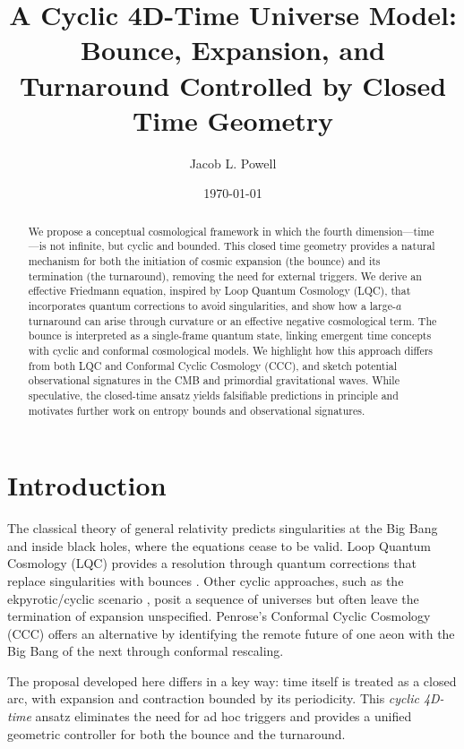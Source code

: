 \documentclass[12pt]{article}
\title{A Cyclic 4D-Time Universe Model: Bounce, Expansion, and Turnaround Controlled by Closed Time Geometry}
\author{Jacob L. Powell}
\date{\today}
\begin{document}
\maketitle

\begin{abstract}
We propose a conceptual cosmological framework in which the fourth dimension---time---is
not infinite, but cyclic and bounded. This closed time geometry provides a natural mechanism
for both the initiation of cosmic expansion (the bounce) and its termination (the turnaround),
removing the need for external triggers. We derive an effective Friedmann equation, inspired by
Loop Quantum Cosmology (LQC), that incorporates quantum corrections to avoid singularities,
and show how a large-$a$ turnaround can arise through curvature or an effective negative
cosmological term. The bounce is interpreted as a single-frame quantum state, linking emergent
time concepts with cyclic and conformal cosmological models. We highlight how this approach
differs from both LQC and Conformal Cyclic Cosmology (CCC), and sketch potential observational
signatures in the CMB and primordial gravitational waves. While speculative, the closed-time
ansatz yields falsifiable predictions in principle and motivates further work on entropy bounds
and observational signatures.
\end{abstract}

\section{Introduction}
The classical theory of general relativity predicts singularities at the Big Bang and inside
black holes, where the equations cease to be valid. Loop Quantum Cosmology (LQC) provides
a resolution through quantum corrections that replace singularities with bounces
\cite{Ashtekar2006,Bojowald2001}. Other cyclic approaches, such as the ekpyrotic/cyclic
scenario \cite{Steinhardt2002}, posit a sequence of universes but often leave the termination
of expansion unspecified. Penrose's Conformal Cyclic Cosmology (CCC) \cite{Penrose2010}
offers an alternative by identifying the remote future of one aeon with the Big Bang of the
next through conformal rescaling.

The proposal developed here differs in a key way: time itself is treated as a closed arc,
with expansion and contraction bounded by its periodicity. This \emph{cyclic 4D-time} ansatz
eliminates the need for ad hoc triggers and provides a unified geometric controller for both
the bounce and the turnaround.
\end{document}
